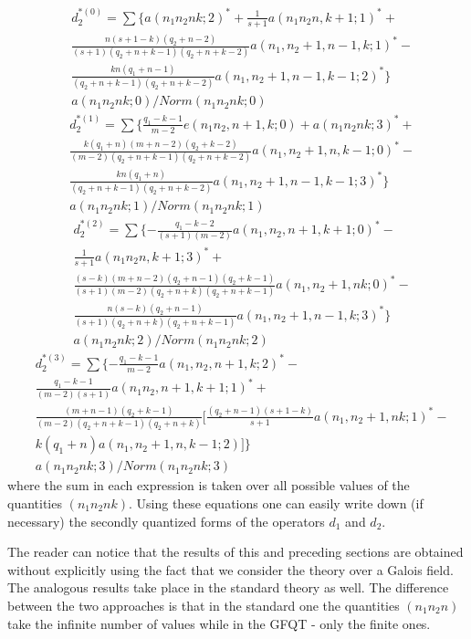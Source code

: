 \documentclass[a4paper,12pt]{article}%
\begin{document}
\begin{eqnarray}
&d_2^{*(0)}=\sum\{a(n_1n_2nk;2)^*+\frac{1}{s+1}
a(n_1n_2n,k+1;1)^*+\nonumber\\
&\frac{n(s+1-k)(q_2+n-2)}{(s+1)(q_2+n+k-1)(q_2+n+k-2)}
a(n_1,n_2+1,n-1,k;1)^*-\nonumber\\
&\frac{kn(q_1+n-1)}{(q_2+n+k-1)(q_2+n+k-2)}
a(n_1,n_2+1,n-1,k-1;2)^*\}\nonumber\\
&a(n_1n_2nk;0)/Norm(n_1n_2nk;0)
\label{67}
\end{eqnarray}
\begin{eqnarray}
&d_2^{*(1)}=\sum\{\frac{q_1-k-1}{m-2}e(n_1n_2,n+1,k;0)+
a(n_1n_2nk;3)^*+\nonumber\\
&\frac{k(q_1+n)(m+n-2)(q_2+k-2)}{(m-2)(q_2+n+k-1)(q_2+n+k-2)}
a(n_1,n_2+1,n,k-1;0)^*-\nonumber\\
&\frac{kn(q_1+n)}{(q_2+n+k-1)(q_2+n+k-2)}
a(n_1,n_2+1,n-1,k-1;3)^*\}\nonumber\\
&a(n_1n_2nk;1)/Norm(n_1n_2nk;1)
\label{68}
\end{eqnarray}
\begin{eqnarray}
&d_2^{*(2)}=\sum\{-\frac{q_1-k-2}{(s+1)(m-2)}
a(n_1,n_2,n+1,k+1;0)^*-\nonumber\\
&\frac{1}{s+1}a(n_1n_2n,k+1;3)^*+\nonumber\\
&\frac{(s-k)(m+n-2)(q_2+n-1)(q_2+k-1)}{(s+1)(m-2)(q_2+n+k)(q_2+n+k-1)}
a(n_1,n_2+1,nk;0)^*-\nonumber\\
&\frac{n(s-k)(q_2+n-1)}{(s+1)(q_2+n+k)(q_2+n+k-1)}
a(n_1,n_2+1,n-1,k;3)^*\}\nonumber\\
&a(n_1n_2nk;2)/Norm(n_1n_2nk;2)
\label{69}
\end{eqnarray}
\begin{eqnarray}
&d_2^{*(3)}=\sum\{-\frac{q_1-k-1}{m-2}
a(n_1,n_2,n+1,k;2)^*-\nonumber\\
&\frac{q_1-k-1}{(m-2)(s+1)}
a(n_1n_2,n+1,k+1;1)^*+\nonumber\\
&\frac{(m+n-1)(q_2+k-1)}{(m-2)(q_2+n+k-1)(q_2+n+k)}
[\frac{(q_2+n-1)(s+1-k)}{s+1}a(n_1,n_2+1,nk;1)^*-\nonumber\\
&k(q_1+n)a(n_1,n_2+1,n,k-1;2)]\}\nonumber\\
&a(n_1n_2nk;3)/Norm(n_1n_2nk;3)
\label{70}
\end{eqnarray}
where the sum in each expression is taken over all
possible values of the quantities $(n_1n_2nk)$.
Using these equations one can easily write down
(if necessary) the secondly quantized forms of the
operators $d_1$ and $d_2$.

The reader can notice that the results of this and 
preceding sections are obtained without explicitly
using the fact that we consider the theory over a
Galois field. The analogous results take place in the
standard theory as well. The difference between the two
approaches is that in the standard one the quantities
$(n_1n_2n)$ take the infinite number of values while
in the GFQT - only the finite ones. 
  
\end{document}
